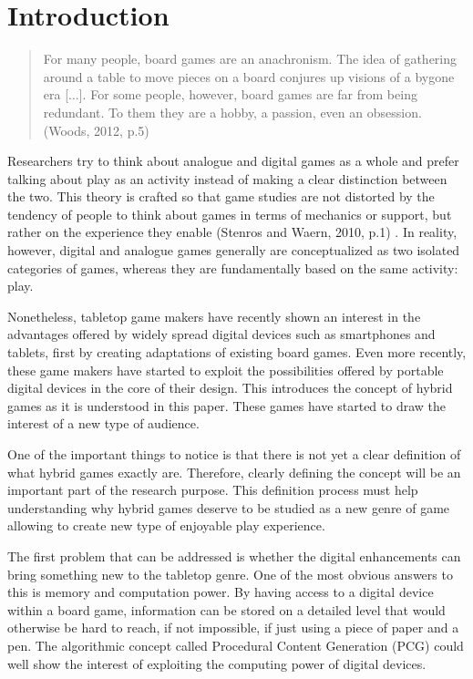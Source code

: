 \chapter{Introduction}
\begin{quotation}
For many people, board games are an anachronism. The idea of gathering around a table to move pieces on a board conjures up visions of a bygone era [...]. For some people, however, board games are far from being redundant. To them they are a hobby, a passion, even an obsession. (Woods, 2012, p.5) \cite{book:euro}
\end{quotation}

Researchers try to think about analogue and digital games as a whole and prefer talking about play as an activity instead of making a clear distinction between the two. This theory is crafted so that game studies are not distorted by the tendency of people to think about games in terms of mechanics or support, but rather on the experience they enable (Stenros and Waern, 2010, p.1) \cite{art:stenroswaern}. In reality, however, digital and analogue games generally are conceptualized as two isolated categories of games, whereas they are fundamentally based on the same activity: play. 

Nonetheless, tabletop game makers have recently shown an interest in the advantages offered by widely spread digital devices such as smartphones and tablets, first by creating adaptations of existing board games. Even more recently, these game makers have started to exploit the possibilities offered by portable digital devices in the core of their design. This introduces the concept of hybrid games as it is understood in this paper. These games have started to draw the interest of a new type of audience.

One of the important things to notice is that there is not yet a clear definition of what hybrid games exactly are. Therefore, clearly defining the concept will be an important part of the research purpose. This definition process must help understanding why hybrid games deserve to be studied as a new genre of game allowing to create new type of enjoyable play experience. 

The first problem that can be addressed is whether the digital enhancements can bring something new to the tabletop genre. One of the most obvious answers to this is memory and computation power. By having access to a digital device within a board game, information can be stored on a detailed level that would otherwise be hard to reach, if not impossible, if just using a piece of paper and a pen. The algorithmic concept called Procedural Content Generation (PCG) could well show the interest of exploiting the computing power of digital devices. 

